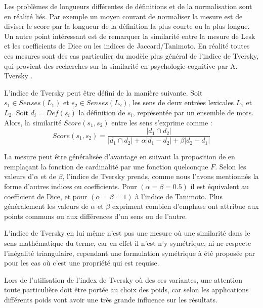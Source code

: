 \documentclass[10pt,a4paper,twoside]{article}
\begin{document}
 
 Les problèmes de longueurs différentes de définitions et de la normalisation sont en réalité liés. Par exemple un moyen courant de normaliser la mesure est de diviser le score par la longueur de la définition la plus courte ou la plus longue.
 Un autre point intéressant est de remarquer la similarité entre la mesure de Lesk et les coefficients de Dice ou les indices de Jaccard/Tanimoto. En réalité toutes ces mesures sont des cas particulier du modèle plus général de l'indice de Tversky, qui provient des recherches sur la similarité en psychologie cognitive par A. Tversky \cite{tversky77similarity}.

L'indice de Tversky peut être défini de la manière suivante. Soit \(s_1 \in Senses(L_1)\)  et \(s_2 \in Senses(L_2)\), les sens de deux entrées lexicales \(L_1\) et \(L_2\). Soit \(d_i=Def(s_i)\) la définition de \(s_i\), représentée par un ensemble de mots. Alors, la similarité \(Score(s_1, s_2)\) entre les sens s'exprime comme :
\[
Score(s_1,s_2) = 
\frac{|d_1\cap d_2|}{|d_1\cap d_2| + \alpha |d_1-d_2| + \beta |d_2-d_1|}
\]

La mesure peut être généralisée d'avantage en suivant la proposition de \cite{DBLP:conf/otm/PirroE10} en remplaçant la fonction de cardinalité par une fonction quelconque \(F\). Selon les valeurs d'\(\alpha\) et de \(\beta\), l'indice de Tversky prends, comme nous l'avons mentionnés la forme d'autres indices ou coefficients. Pour \((\alpha=\beta=0.5)\) il est équivalent au coefficient de  Dice, et pour \((\alpha=\beta=1)\) à l'indice de Tanimoto. Plus généralement les valeurs de   \(\alpha\) et \(\beta\) expriment combien d'emphase ont attribue aux points communs ou aux différences d'un sens ou de l'autre.

L'indice de Tversky en lui même n'est pas une mesure où une similarité dans le sens mathématique du terme, car en effet il n'est n'y symétrique, ni ne respecte l'inégalité triangulaire, cependant une formulation symétrique à été proposée par 
\cite{Jimenez2010}  pour les cas où c'est une propriété qui est requise. 
% 
 
 Lors de l'utilisation de l'index de Tversky où des ces variantes, une attention toute particulière doit être portée au choix des poids, car selon les applications différents poids vont avoir une très grande influence sur les résultats. 
\end{document}
